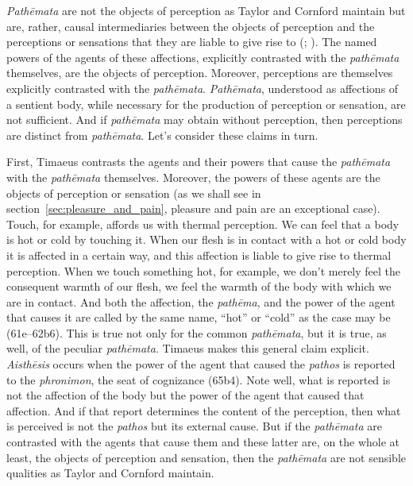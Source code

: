 \emph{Pathēmata} are not the objects of perception as Taylor and Cornford maintain but are, rather, causal intermediaries between the objects of perception and the perceptions or sensations that they are liable to give rise to (\citealt[138]{OBrien:1984ji}; \citealt{Brisson:1997qr}). The named powers of the agents of these affections, explicitly contrasted with the \emph{pathēmata} themselves, are the objects of perception. Moreover, perceptions are themselves explicitly contrasted with the \emph{pathēmata}. \emph{Pathēmata}, understood as affections of a sentient body, while necessary for the production of perception or sensation, are not sufficient. And if \emph{pathēmata} may obtain without perception, then perceptions are distinct from \emph{pathēmata}. Let's consider these claims in turn.

First, Timaeus contrasts the agents and their powers that cause the \emph{pathēmata} with the \emph{pathēmata} themselves. Moreover, the powers of these agents are the objects of perception or sensation (as we shall see in section~\ref{sec:pleasure_and_pain}, pleasure and pain are an exceptional case). Touch, for example, affords us with thermal perception. We can feel that a body is hot or cold by touching it. When our flesh is in contact with a hot or cold body it is affected in a certain way, and this affection is liable to give rise to thermal perception. When we touch something hot, for example, we don't merely feel the consequent warmth of our flesh, we feel the warmth of the body with which we are in contact. And both the affection, the \emph{pathēma}, and the power of the agent that causes it are called by the same name, ``hot'' or ``cold'' as the case may be (61e--62b6). This is true not only for the common \emph{pathēmata}, but it is true, as well, of the peculiar \emph{pathēmata}. Timaeus makes this general claim explicit. \emph{Aisthēsis} occurs when the power of the agent that caused the \emph{pathos} is reported to the \emph{phronimon}, the seat of cognizance (65b4). Note well, what is reported is not the affection of the body but the power of the agent that caused that affection. And if that report determines the content of the perception, then what is perceived is not the \emph{pathos} but its external cause. But if the \emph{pathēmata} are contrasted with the agents that cause them and these latter are, on the whole at least, the objects of perception and sensation, then the \emph{pathēmata} are not sensible qualities as Taylor and Cornford maintain.

